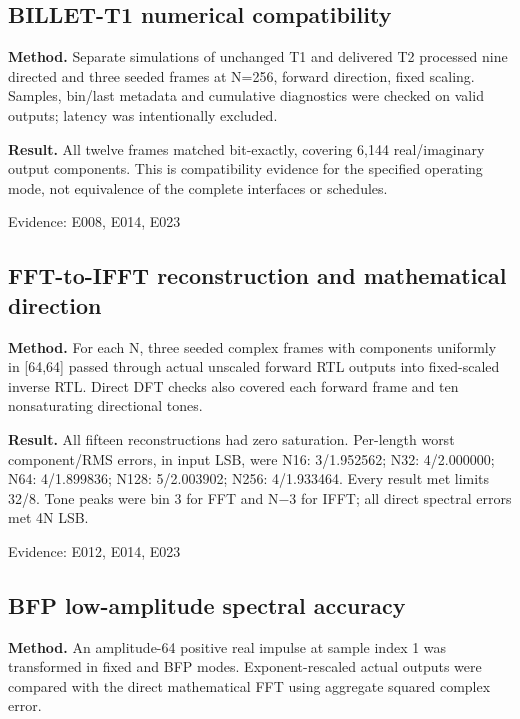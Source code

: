 \documentclass[11pt,a4paper]{article}
\begin{document}
\subsection{BILLET-T1 numerical compatibility}

\textbf{Method.} Separate simulations of unchanged T1 and delivered T2 processed nine directed and three seeded frames at N=\allowbreak{}256,\allowbreak{} forward direction,\allowbreak{} fixed scaling. Samples,\allowbreak{} bin/\allowbreak{}last metadata and cumulative diagnostics were checked on valid outputs; latency was intentionally excluded.

\textbf{Result.} All twelve frames matched bit-exactly,\allowbreak{} covering 6,\allowbreak{}144 real/\allowbreak{}imaginary output components. This is compatibility evidence for the specified operating mode,\allowbreak{} not equivalence of the complete interfaces or schedules.

{\small Evidence: E008,\allowbreak{} E014,\allowbreak{} E023}

\subsection{FFT-to-IFFT reconstruction and mathematical direction}

\textbf{Method.} For each N,\allowbreak{} three seeded complex frames with components uniformly in [64,\allowbreak{}64]\allowbreak{} passed through actual unscaled forward RTL outputs into fixed-scaled inverse RTL. Direct DFT checks also covered each forward frame and ten nonsaturating directional tones.

\textbf{Result.} All fifteen reconstructions had zero saturation. Per-length worst component/\allowbreak{}RMS errors,\allowbreak{} in input LSB,\allowbreak{} were N16: 3/\allowbreak{}1.952562; N32: 4/\allowbreak{}2.000000; N64: 4/\allowbreak{}1.899836; N128: 5/\allowbreak{}2.003902; N256: 4/\allowbreak{}1.933464. Every result met limits 32/\allowbreak{}8. Tone peaks were bin 3 for FFT and N{\vulcanmathsymbols −}3 for IFFT; all direct spectral errors met 4N LSB.

{\small Evidence: E012,\allowbreak{} E014,\allowbreak{} E023}

\subsection{BFP low-amplitude spectral accuracy}

\textbf{Method.} An amplitude-64 positive real impulse at sample index 1 was transformed in fixed and BFP modes. Exponent-rescaled actual outputs were compared with the direct mathematical FFT using aggregate squared complex error.
\end{document}
